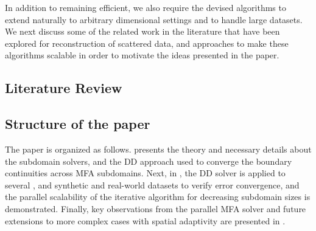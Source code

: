 In addition to remaining efficient, we also require the devised algorithms to extend naturally to arbitrary dimensional settings and to handle large datasets. We next discuss some of the related work in the literature that have been explored for reconstruction of scattered data, and approaches to make these algorithms scalable in order to motivate the ideas presented in the paper. %





\subsection*{Literature Review}


\subsection*{Structure of the paper}

The paper is organized as follows.  presents the theory and necessary details about the subdomain solvers, and the DD approach used to converge the boundary continuities across MFA subdomains. Next, in , the DD solver is applied to several ,  and  synthetic and real-world datasets to verify error convergence, and the parallel scalability of the iterative algorithm for decreasing subdomain sizes is demonstrated. Finally, key observations from the parallel MFA solver and future extensions to more complex cases with spatial adaptivity are presented in .%
